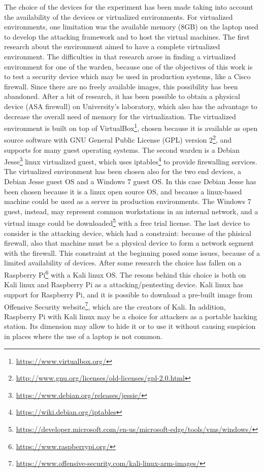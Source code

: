 \documentclass[12pt]{article}
\begin{document}
The choice of the devices for the experiment has been made taking into account the availability of the devices or virtualized environments. For virtualized environments, one limitation was the available memory (8GB) on the laptop used to develop the attacking framework and to host the virtual machines. The first research about the environment aimed to have a complete virtualized environment. The difficulties in that research arose in finding a virtualized environment for one of the warden, because one of the objectives of this work is to test a security device which may be used in production systems, like a Cisco firewall. Since there are no freely available images, this possibility has been abandoned. After a bit of research, it has been possible to obtain a physical device (ASA firewall) on University's laboratory, which also has the advantage to decrease the overall need of memory for the virtualization. The virtualized environment is built on top of VirtualBox\footnote{\url{https://www.virtualbox.org/}}, chosen because it is available as open source software with GNU General Public License (GPL) version 2\footnote{\url{http://www.gnu.org/licenses/old-licenses/gpl-2.0.html}}, and supports for many guest operating systems. The second warden is a Debian Jesse\footnote{\url{https://www.debian.org/releases/jessie/}} linux virtualized guest, which uses iptables\footnote{\url{https://wiki.debian.org/iptables}} to provide firewalling services. The virtualized environment has been chosen also for the two end devices, a Debian Jesse guest OS and a Windows 7 guest OS. In this case Debian Jesse has been chosen because it is a linux open source OS, and because a linux-based machine could be used as a server in production environments. The Windows 7 guest, instead, may represent common workstations in an internal network, and a virtual image could be downloaded\footnote{\url{https://developer.microsoft.com/en-us/microsoft-edge/tools/vms/windows/}} with a free trial license. The last device to consider is the attacking device, which had a constraint: because of the phisical firewall, also that machine must be a physical device to form a network segment with the firewall. This constraint at the beginning posed some issues, because of a limited availability of devices. After some research the choice has fallen on a Raspberry Pi\footnote{\url{https://www.raspberrypi.org/}} with a Kali linux OS. The resons behind this choice is both on Kali linux and Raspberry Pi as a attacking/pentesting device. Kali linux has support for Raspberry Pi, and it is possible to download a pre-built image from Offensive Security website\footnote{\url{https://www.offensive-security.com/kali-linux-arm-images/}}, which are the creators of Kali. In addition, Raspberry Pi with Kali linux may be a choice for attackers as a portable hacking station. Its dimension may allow to hide it or to use it without causing suspicion in places where the use of a laptop is not common.
\end{document}
